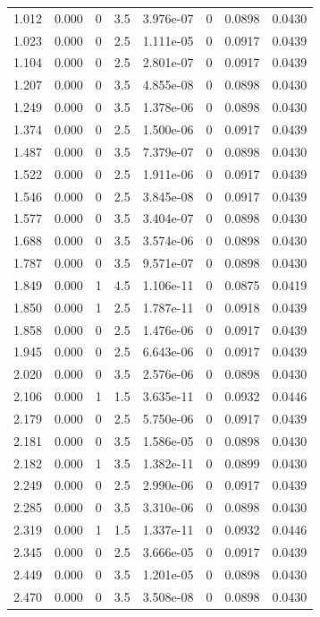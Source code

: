 \documentclass[preview]{standalone}
\begin{document}
{{\begin{tabular}{L{1.2cm}C{1.2cm} C{0.3cm}C{0.5cm} C{1.4cm}C{1.4cm} C{1.4cm}C{1.4cm}}
  1.012  &  0.000  & 0     & 3.5 &  3.976e-07  & 0  & 0.0898 &  0.0430   \\ 
  1.023  &  0.000  & 0     & 2.5 &  1.111e-05  & 0  & 0.0917 &  0.0439   \\ 
  1.104  &  0.000  & 0     & 2.5 &  2.801e-07  & 0  & 0.0917 &  0.0439   \\ 
  1.207  &  0.000  & 0     & 3.5 &  4.855e-08  & 0  & 0.0898 &  0.0430   \\ 
  1.249  &  0.000  & 0     & 3.5 &  1.378e-06  & 0  & 0.0898 &  0.0430   \\ 
  1.374  &  0.000  & 0     & 2.5 &  1.500e-06  & 0  & 0.0917 &  0.0439   \\ 
  1.487  &  0.000  & 0     & 3.5 &  7.379e-07  & 0  & 0.0898 &  0.0430   \\ 
  1.522  &  0.000  & 0     & 2.5 &  1.911e-06  & 0  & 0.0917 &  0.0439   \\ 
  1.546  &  0.000  & 0     & 2.5 &  3.845e-08  & 0  & 0.0917 &  0.0439   \\ 
  1.577  &  0.000  & 0     & 3.5 &  3.404e-07  & 0  & 0.0898 &  0.0430   \\ 
  1.688  &  0.000  & 0     & 3.5 &  3.574e-06  & 0  & 0.0898 &  0.0430   \\ 
  1.787  &  0.000  & 0     & 3.5 &  9.571e-07  & 0  & 0.0898 &  0.0430   \\ 
  1.849  &  0.000  & 1     & 4.5 &  1.106e-11  & 0  & 0.0875 &  0.0419   \\ 
  1.850  &  0.000  & 1     & 2.5 &  1.787e-11  & 0  & 0.0918 &  0.0439   \\ 
  1.858  &  0.000  & 0     & 2.5 &  1.476e-06  & 0  & 0.0917 &  0.0439   \\ 
  1.945  &  0.000  & 0     & 2.5 &  6.643e-06  & 0  & 0.0917 &  0.0439   \\ 
  2.020  &  0.000  & 0     & 3.5 &  2.576e-06  & 0  & 0.0898 &  0.0430   \\ 
  2.106  &  0.000  & 1     & 1.5 &  3.635e-11  & 0  & 0.0932 &  0.0446   \\ 
  2.179  &  0.000  & 0     & 2.5 &  5.750e-06  & 0  & 0.0917 &  0.0439   \\ 
  2.181  &  0.000  & 0     & 3.5 &  1.586e-05  & 0  & 0.0898 &  0.0430   \\ 
  2.182  &  0.000  & 1     & 3.5 &  1.382e-11  & 0  & 0.0899 &  0.0430   \\ 
  2.249  &  0.000  & 0     & 2.5 &  2.990e-06  & 0  & 0.0917 &  0.0439   \\ 
  2.285  &  0.000  & 0     & 3.5 &  3.310e-06  & 0  & 0.0898 &  0.0430   \\ 
  2.319  &  0.000  & 1     & 1.5 &  1.337e-11  & 0  & 0.0932 &  0.0446   \\ 
  2.345  &  0.000  & 0     & 2.5 &  3.666e-05  & 0  & 0.0917 &  0.0439   \\ 
  2.449  &  0.000  & 0     & 3.5 &  1.201e-05  & 0  & 0.0898 &  0.0430   \\ 
  2.470  &  0.000  & 0     & 3.5 &  3.508e-08  & 0  & 0.0898 &  0.0430   \\ 
\hline 
\end{tabular} 

}}
\end{document}
